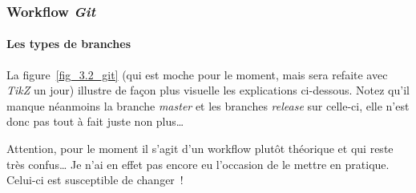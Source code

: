 \subsubsection{Workflow \emph{Git}}

\paragraph{Les types de branches}
La figure~\ref{fig_3.2_git} (qui est moche pour le moment, mais sera refaite avec \emph{TikZ} un jour) illustre de façon plus visuelle les explications ci-dessous.
Notez qu'il manque néanmoins la branche \emph{master} et les branches \emph{release} sur celle-ci, elle n'est donc pas tout à fait juste non plus\dots

Attention, pour le moment il s'agit d'un workflow plutôt théorique et qui reste très confus\dots
Je n'ai en effet pas encore eu l'occasion de le mettre en pratique. Celui-ci est susceptible de changer~!

